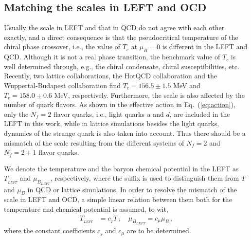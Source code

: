 \documentclass[%
reprint,
superscriptaddress,
showpacs,preprintnumbers,
 amsmath,amssymb,
 aps,
prd,
]{revtex4-1}
\def\Eq#1{Eq.~(\ref{#1})}
\begin{document}
\subsection{Matching the scales in LEFT and OCD}
\label{subsec:scale}

Usually the scale in LEFT and that in QCD do not agree with each other exactly, and a direct consequence is that the pseudocritical temperature of the chiral phase crossover, i.e., the value of $T_c$ at $\mu_B=0$ is different in the LEFT and QCD. Although it is not a real phase transition, the benchmark value of $T_c$ is well determined through, e.g., the chiral condensate, chiral susceptibilities, etc. Recently, two lattice collaborations, the HotQCD collaboration and the Wuppertal-Budapest collaboration find $T_c=156.5\pm 1.5$ MeV \cite{Bazavov:2018mes} and $T_c=158.0\pm 0.6$ MeV, respectively. Furthermore, the scale is also affected by the number of quark flavors. As shown in the effective action in \Eq{eq:action}, only the $N_f=2$ flavor quarks, i.e., light quarks $u$ and $d$, are included in the LEFT in this work, while in lattice simulations besides the light quarks, dynamics of the strange quark is also taken into account. Thus there should be a mismatch of the scale resulting from the different systems of $N_f=2$ and $N_f=2+1$ flavor quarks.

We denote the temperature and the baryon chemical potential in the LEFT as $T_{_{LEFT}}$ and $\mu_{B_{LEFT}}$, respectively, where the suffix is used to distinguish them from $T$ and $\mu_{B}$ in QCD or lattice simulations. In order to resolve the mismatch of the scale in LEFT and OCD, a simple linear relation between them both for the temperature and chemical potential is assumed, to wit,
\begin{align}
  T_{_{LEFT}}&=c_{_{T}}T\,, \quad \mu_{B_{LEFT}}=c_{\mu}\mu_{B}\,,\label{eq:rescale}
\end{align}
where the constant coefficients $c_{_{T}}$ and $c_{\mu}$ are to be determined.
\end{document}
